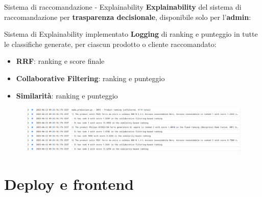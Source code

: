 \documentclass{beamer}
\begin{document}
	\begin{frame}{Sistema di raccomandazione - Explainability}
		\textbf{Explainability} del sistema di raccomandazione per \textbf{trasparenza decisionale}, disponibile solo per l'\textbf{admin}:

		\begin{alertblock}{Sistema di Explainability implementato}
			\textbf{Logging} di ranking e punteggio in tutte le classifiche generate, per ciascun prodotto o cliente raccomandato:
			\begin{itemize}
				\item \textbf{RRF}: ranking e score finale
				\item \textbf{Collaborative Filtering}: ranking e punteggio
				\item \textbf{Similarità}: ranking e punteggio
			\end{itemize}
		\end{alertblock}

		\begin{figure}
			\centering
			\includegraphics[width=\textwidth]{Explainability - Log della task Recommendation System.png}
		\end{figure}
	\end{frame}


	\section{Deploy e frontend}
\end{document}
